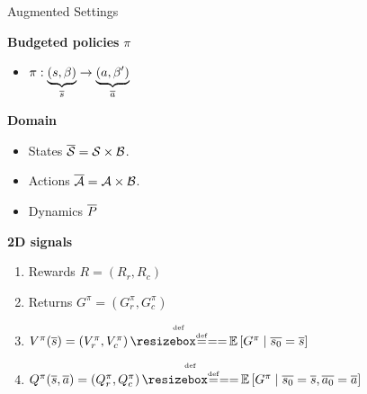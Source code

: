 \documentclass[french,handout]{beamer}
\begin{document}
    \begin{frame}{Augmented Settings}

        \textbf{Budgeted policies} $\pi$
        \begin{itemize}
            \pause\item $ \pi:\underbrace{(s,\beta)}_{\overline{s}} \rightarrow \underbrace{(a,\beta')}_{\overline{a}}$
        \end{itemize}

        \textbf{Domain}
        \begin{itemize}
            \pause\item States $\overline{\mathcal{S}} = \mathcal{S}\times\mathcal{B}$.
            \pause\item Actions $\overline{\mathcal{A}} = \mathcal{A}\times\mathcal{B}$.
            \pause\item Dynamics $\overline{P}$
        \end{itemize}
        \textbf{2D signals}
        \begin{enumerate}
            \pause\item Rewards $R = (R_r, R_c)$
            \pause\item Returns $G^\pi = (G_r^\pi, G_c^\pi)$
            \pause\item $V^\pi(\os) = (V_r^\pi, V_c^\pi) \eqdef \expectedvalue\left[ G^\pi \condbar \ov{s_0} = \os\right]$
            \pause\item $Q^\pi(\os, \oa)= (Q_r^\pi, Q_c^\pi) \eqdef \expectedvalue\left[ G^\pi \condbar \ov{s_0} = \os, \ov{a_0} = \oa\right]$
        \end{enumerate}

    \end{frame}
\end{document}
